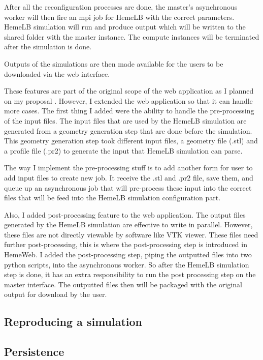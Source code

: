 After all the reconfiguration processes are done, the master's asynchronous worker will then fire an mpi job for HemeLB with the correct parameters. HemeLB simulation will run and produce output which will be written to the shared folder with the master instance. The compute instances will be terminated after the simulation is done.

Outputs of the simulations are then made available for the users to be downloaded via the web interface.

These features are part of the original scope of the web application as I planned on my proposal \citep{Steven:2016aa}. However, I extended the web application so that it can handle more cases. The first thing I added were the ability to handle the pre-processing of the input files. The input files that are used by the HemeLB simulation are generated from a geometry generation step that are done before the simulation. This geometry generation step took different input files, a geometry file (.stl) and a profile file (.pr2) to generate the input that HemeLB simulation can parse. 

The way I implement the pre-processing stuff is to add another form for user to add input files to create new job. It receive the .stl and .pr2 file, save them, and queue up an asynchronous job that will pre-process these input into the correct files that will be feed into the HemeLB simulation configuration part.

Also, I added post-processing feature to the web application. The output files generated by the HemeLB simulation are effective to write in parallel. However, these files are not directly viewable by software like VTK viewer. These files need further post-processing, this is where the post-processing step is introduced in HemeWeb. I added the post-processing step, piping the outputted files into two python scripts, into the asynchronous worker. So after the HemeLB simulation step is done, it has an extra responsibility to run the post processing step on the master interface. The outputted files then will be packaged with the original output for download by the user.


\subsection{Reproducing a simulation}


\subsection{Persistence}


